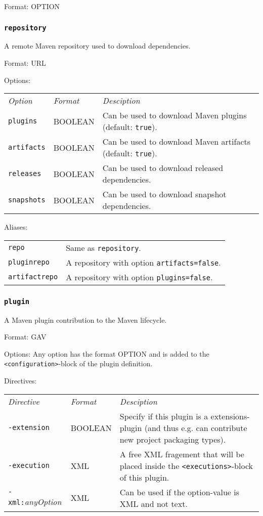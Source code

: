 \documentclass[a4paper,12pt,english,oneside,halfparskip]{scrartcl}
\newcommand{\code}[1]{\texttt{#1}}
\begin{document}
Format: OPTION

\subsubsection{\code{repository}}

A remote Maven repository used to download dependencies.

Format: URL

Options:

\begin{tabular}{llp{}}
\emph{Option} & \emph{Format} & \emph{Desciption} \\
\code{plugins} &  BOOLEAN & Can be used to download Maven plugins (default: \code{true}). \\
\code{artifacts} &  BOOLEAN & Can be used to download Maven artifacts (default: \code{true}). \\
\code{releases} &  BOOLEAN & Can be used to download released dependencies. \\
\code{snapshots} &  BOOLEAN & Can be used to download snapshot dependencies. \\
\end{tabular}

Aliases:

\begin{tabular}{ll}
\code{repo} &  Same as \code{repository}. \\
\code{pluginrepo} & A repository with option \code{artifacts=false}. \\
\code{artifactrepo} &  A repository with option \code{plugins=false}. \\
\end{tabular}


\subsubsection{\code{plugin}}

A Maven plugin contribution to the Maven lifecycle.

Format: GAV

Options: Any option has the format OPTION and is added to the \code{<configuration>}-block of the plugin definition.


Directives: 

\begin{tabular}{llp{}}
\emph{Directive} & \emph{Format} & \emph{Desciption} \\
\code{-extension} & BOOLEAN & Specify if this plugin is a extensions-plugin (and thus e.g. can contribute new project packaging types). \\
\code{-execution} & XML & A free XML fragement that will be placed inside the \code{<executions>}-block of this plugin. \\
\code{-xml:}\emph{anyOption} & XML & Can be used if the option-value is XML and not text. \\
\end{tabular}
\end{document}

